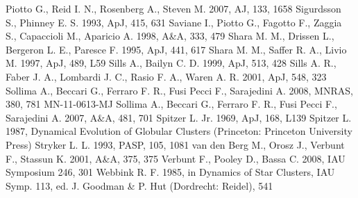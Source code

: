\begin{thebibliography}{99}
  Piotto G., Reid  I. N., Rosenberg A., Steven M. 2007, AJ, 133, 1658
 Sigurdsson S., Phinney E. S. 1993, ApJ, 415, 631
  Saviane I., Piotto G., Fagotto F., Zaggia S., Capaccioli M.,
  Aparicio A. 1998, A\&A, 333, 479
 Shara
  M. M., Drissen L., Bergeron L. E.,  Paresce F. 1995, ApJ, 441, 617
 Shara M. M., Saffer R. A., Livio M. 1997,
  ApJ, 489, L59
 Sills A., Bailyn C. D. 1999,
  ApJ, 513, 428 
 Sills A. R., Faber J. A.,
  Lombardi J. C., Rasio F. A., Waren A. R. 2001, ApJ, 548, 323
  Sollima A., Beccari G., Ferraro F. R., Fusi Pecci F., Sarajedini
  A. 2008, MNRAS, 380, 781
MN-11-0613-MJ  Sollima A., Beccari G., Ferraro F. R., Fusi Pecci F., Sarajedini
  A. 2007, A\&A, 481, 701 
 Spitzer
  L. Jr. 1969, ApJ, 168, L139
 Spitzer L. 1987, Dynamical
  Evolution of Globular Clusters (Princeton: Princeton University
  Press)
 Stryker L. L. 1993,
  PASP, 105, 1081
 van den Berg M.,
  Orosz J., Verbunt F., Stassun K. 2001, A\&A, 375, 375
 Verbunt F., Pooley D., Bassa C. 2008, IAU
  Symposium 246, 301
 Webbink R. F. 1985, in Dynamics of
  Star Clusters, IAU Symp. 113, ed. J. Goodman \& P. Hut (Dordrecht: 
  Reidel), 541

\end{thebibliography}


